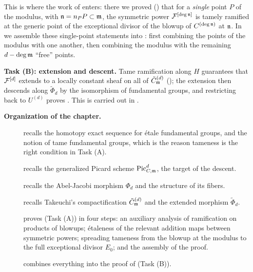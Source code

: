 This is where the work of 
enters: there we proved
() that
for a \emph{single} point $P$ of the modulus, with $\ndls = n_P P \subset
\mdls$, the symmetric power $\cF^{[\deg \ndls]}$ is tamely ramified at the
generic point of the exceptional divisor of the blowup of $C^{(\deg \ndls)}$
at $\ndls$. In  we assemble these
single-point statements into
: first combining the
points of the modulus with one another, then combining the modulus with the
remaining $d - \deg\mdls$ ``free'' points.

\textbf{Task (B): extension and descent.} Tame ramification along $H$
guarantees that $\cF^{[d]}$ extends to a locally constant sheaf on all of
$\Cmod{d}$ (); the extension then
descends along $\tilde{\Phi}_d$ by the isomorphism of fundamental groups,
and restricting back to $U^{(d)}$ proves
. This is carried out in
.

\textbf{Organization of the chapter.}
\begin{description}
    \item[] recalls the homotopy exact sequence
    for \'etale fundamental groups, and the notion of tame fundamental
    groups, which is the reason tameness is the right condition in Task (A).
    \item[] recalls the generalized Picard
    scheme $\PicCm[d]$, the target of the descent.
    \item[] recalls the Abel-Jacobi morphism
    $\Phi_d$ and the structure of its fibers.
    \item[] recalls Takeuchi's
    compactification $\Cmod{d}$ and the extended morphism $\tilde{\Phi}_d$.
    \item[] proves
     (Task (A)) in four
    steps: an auxiliary analysis of ramification on products of blowups;
    \'etaleness of the relevant addition maps between symmetric powers;
    spreading tameness from the blowup at the modulus to the full exceptional
    divisor $E_0$; and the assembly of the proof.
    \item[] combines everything into the
    proof of  (Task (B)).
\end{description}

